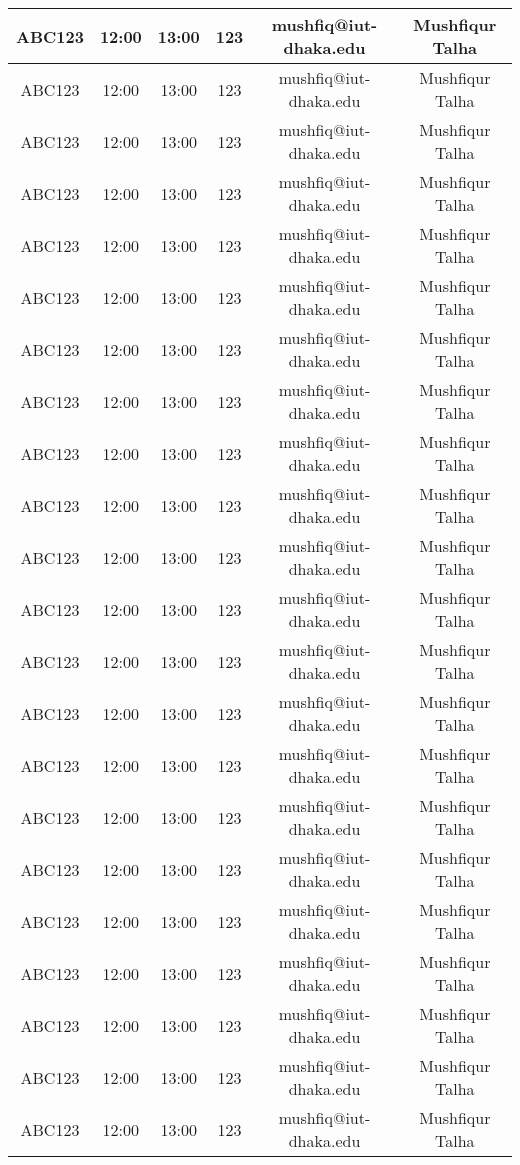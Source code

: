 \documentclass[12pt,notitle]{article}
\begin{document}
\begin{center}
\begin{tabular}{|c|c|c|c|c|c|}
\hline
ABC123 & 12:00 & 13:00 & 123 & mushfiq@iut-dhaka.edu & Mushfiqur Talha \\
\hline
ABC123 & 12:00 & 13:00 & 123 & mushfiq@iut-dhaka.edu & Mushfiqur Talha \\
\hline
ABC123 & 12:00 & 13:00 & 123 & mushfiq@iut-dhaka.edu & Mushfiqur Talha \\
\hline
ABC123 & 12:00 & 13:00 & 123 & mushfiq@iut-dhaka.edu & Mushfiqur Talha \\
\hline
ABC123 & 12:00 & 13:00 & 123 & mushfiq@iut-dhaka.edu & Mushfiqur Talha \\
\hline
ABC123 & 12:00 & 13:00 & 123 & mushfiq@iut-dhaka.edu & Mushfiqur Talha \\
\hline
ABC123 & 12:00 & 13:00 & 123 & mushfiq@iut-dhaka.edu & Mushfiqur Talha \\
\hline
ABC123 & 12:00 & 13:00 & 123 & mushfiq@iut-dhaka.edu & Mushfiqur Talha \\
\hline
ABC123 & 12:00 & 13:00 & 123 & mushfiq@iut-dhaka.edu & Mushfiqur Talha \\
\hline
ABC123 & 12:00 & 13:00 & 123 & mushfiq@iut-dhaka.edu & Mushfiqur Talha \\
\hline
ABC123 & 12:00 & 13:00 & 123 & mushfiq@iut-dhaka.edu & Mushfiqur Talha \\
\hline
ABC123 & 12:00 & 13:00 & 123 & mushfiq@iut-dhaka.edu & Mushfiqur Talha \\
\hline
ABC123 & 12:00 & 13:00 & 123 & mushfiq@iut-dhaka.edu & Mushfiqur Talha \\
\hline
ABC123 & 12:00 & 13:00 & 123 & mushfiq@iut-dhaka.edu & Mushfiqur Talha \\
\hline
ABC123 & 12:00 & 13:00 & 123 & mushfiq@iut-dhaka.edu & Mushfiqur Talha \\
\hline
ABC123 & 12:00 & 13:00 & 123 & mushfiq@iut-dhaka.edu & Mushfiqur Talha \\
\hline
ABC123 & 12:00 & 13:00 & 123 & mushfiq@iut-dhaka.edu & Mushfiqur Talha \\
\hline
ABC123 & 12:00 & 13:00 & 123 & mushfiq@iut-dhaka.edu & Mushfiqur Talha \\
\hline
ABC123 & 12:00 & 13:00 & 123 & mushfiq@iut-dhaka.edu & Mushfiqur Talha \\
\hline
ABC123 & 12:00 & 13:00 & 123 & mushfiq@iut-dhaka.edu & Mushfiqur Talha \\
\hline
ABC123 & 12:00 & 13:00 & 123 & mushfiq@iut-dhaka.edu & Mushfiqur Talha \\
\hline
ABC123 & 12:00 & 13:00 & 123 & mushfiq@iut-dhaka.edu & Mushfiqur Talha \\

\end{tabular}
\end{center}
\end{document}
